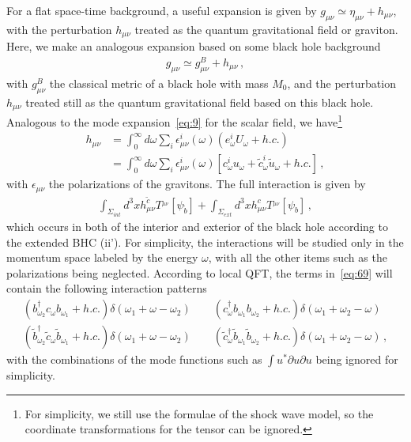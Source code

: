 \documentclass[12pt,a4paper]{article}
\begin{document}
For a flat space-time background, a useful expansion is given by
$g_{\mu\nu}\simeq \eta_{\mu\nu}+h_{\mu\nu}$, with the perturbation
$h_{\mu\nu}$ treated as the quantum gravitational field or graviton. Here, we
make an analogous expansion based on some black hole background
\begin{equation}
\label{eq:67}
\begin{split}
g_{\mu\nu}\simeq g^{B}_{\mu\nu}+h_{\mu\nu} \,,
\end{split}
\end{equation}
with $g^{B}_{\mu\nu}$ the classical metric of a black hole with mass $M_0$,
and the perturbation $h_{\mu\nu}$ treated still as the quantum gravitational field based on this black hole. Analogous
to the mode expansion~\eqref{eq:9} for the scalar field, we
have\footnote{For simplicity, we still use the formulae of the shock wave model, so the coordinate transformations for the tensor can be ignored.}
\begin{align}
\label{eq:68}
h_{\mu\nu}&=\int_{0}^{\infty}
d\omega\sum_i\epsilon^{i}_{\mu\nu}(\omega)(e^{i}_{\omega}U_{\omega}+h.c.) \nonumber\\ 
&=\int_{0}^{\infty}
d\omega\sum_i\epsilon^{i}_{\mu\nu}(\omega)[c^{i}_{\omega}u_{\omega}+\tilde{c}^{i}_{\omega}\tilde{u}_{\omega}+h.c.]
\,,
\end{align}
with $\epsilon_{\mu\nu}$ the polarizations of the gravitons. The full interaction is given by
\begin{equation}
\label{eq:69}
\begin{split}
\int_{\Sigma_{int}}
d^3xh^{\tilde{c}}_{\mu\nu}T^{_{\mu\nu}}[\psi_{\tilde{b}}]+\int_{\Sigma_{ext}}
d^3xh^{c}_{\mu\nu}T^{_{\mu\nu}}[\psi_b] \,,
\end{split}
\end{equation}
which occurs in both of the interior and exterior of the black hole according to the extended BHC (ii'). For simplicity, the interactions will be studied only in the momentum
space labeled by the energy $\omega$, with all the other items such
as the polarizations being neglected. According to local QFT, the terms in~\eqref{eq:69} will
contain the following interaction patterns
\begin{equation}
\label{eq:70}
\begin{split}
(b_{\omega_2}^{\dag}c_{\omega}b_{\omega_1}+h.c.)\delta(\omega_1+\omega-\omega_2)\qquad
(c_{\omega}^{\dag}b_{\omega_1}b_{\omega_2}+h.c.)\delta(\omega_1+\omega_2-\omega)\\
(\tilde{b}_{\omega_2}^{\dag}\tilde{c}_{\omega}\tilde{b}_{\omega_1}+h.c.)\delta(\omega_1+\omega-\omega_2)\qquad
(\tilde{c}_{\omega}^{\dag}\tilde{b}_{\omega_1}\tilde{b}_{\omega_2}+h.c.)\delta(\omega_1+\omega_2-\omega)
\,,
\end{split}
\end{equation}
with the combinations of the mode functions such as $\int u^*\partial u\partial u$ being ignored for simplicity.
\end{document}
